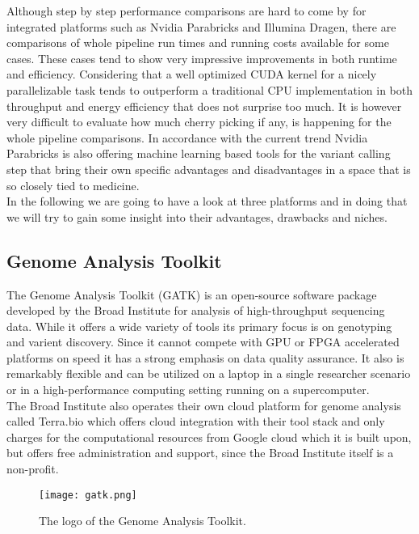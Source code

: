 \documentclass[conference]{IEEEtran}
\begin{document}
Although step by step performance comparisons are hard to come by for integrated platforms such as Nvidia Parabricks and Illumina Dragen, there are comparisons of whole pipeline run times and running costs available for some cases. These cases tend to show very impressive improvements in both runtime and efficiency. Considering that a well optimized CUDA kernel for a nicely parallelizable task tends to outperform a traditional CPU implementation in both throughput and energy efficiency that does not surprise too much. It is however very difficult to evaluate how much cherry picking if any, is happening for the whole pipeline comparisons. In accordance with the current trend Nvidia Parabricks is also offering machine learning based tools for the variant calling step that bring their own specific advantages and disadvantages in a space that is so closely tied to medicine. \\
In the following we are going to have a look at three platforms and in doing that we will try to gain some insight into their advantages, drawbacks and niches.





\subsection{Genome Analysis Toolkit}
The Genome Analysis Toolkit (GATK) is an open-source software package developed by the Broad Institute for analysis of high-throughput sequencing data. While it offers a wide variety of tools its primary focus is on genotyping and varient discovery. Since it cannot compete with GPU or FPGA accelerated platforms on speed it has a strong emphasis on data quality assurance. It also is remarkably flexible and can be utilized on a laptop in a single researcher scenario or in a high-performance computing setting running on a supercomputer. \\
The Broad Institute also operates their own cloud platform for genome analysis called Terra.bio which offers cloud integration with their tool stack and only charges for the computational resources from  Google cloud which it is built upon, but offers free administration and support, since the Broad Institute itself is a non-profit\cite{noauthor_technical_nodate}.


\begin{figure}
    \centering
    \texttt{[image: gatk.png]}
    \caption{The logo of the Genome Analysis Toolkit.}
    \label{fig:your_label}
\end{figure}
\end{document}
